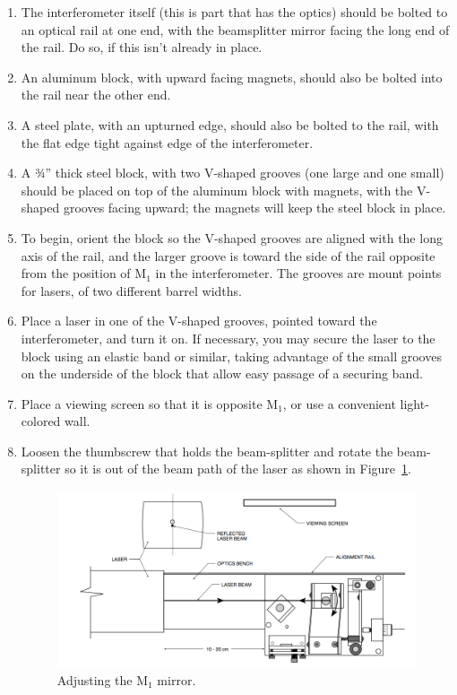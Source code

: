 \begin{enumerate}
	\item The interferometer itself (this is part that has the optics) should be bolted to an optical rail at one end, with the
beamsplitter mirror facing the long end of the rail. Do so, if this isn't already in place.

	\item An aluminum block, with upward
facing magnets, should also be bolted into the rail near the other end.

	\item A steel plate, with an upturned edge, should
also be bolted to the rail, with the flat edge tight against edge of the interferometer.

	\item A 3⁄4” thick steel block, with two V-shaped grooves (one large and one small) should be placed on top of the aluminum block with magnets, with the V-shaped grooves facing upward; the magnets will keep the steel block in place.
	
	\item To begin, orient the block so the V-shaped grooves are aligned with the long axis of the rail, and the larger groove is toward the side of the rail opposite from the position of M$_1$ in the interferometer. The grooves are mount points for lasers, of two different barrel widths.
	
	\item Place a laser in one of the V-shaped grooves, pointed toward the interferometer, and turn it on. If necessary, you may secure the laser to the block using an elastic band or similar, taking advantage of the small grooves on the underside of the block that allow easy passage of a securing band.
	
	\item Place a viewing screen so that it is opposite M$_1$, or use a convenient light-colored wall.
	
	\item Loosen the thumbscrew that holds the beam-splitter and rotate the beam-splitter so it is out of the beam path of the
	laser as shown in Figure~\ref{mi:fig:adjusting-m1}.
	
	\begin{figure}
		\centering
		\includegraphics[width=\textwidth]{michelson-interferometer/adjusting-m1.png}
		\caption{Adjusting the M$_1$ mirror.}\label{mi:fig:adjusting-m1}
	\end{figure}
	

\end{enumerate}
